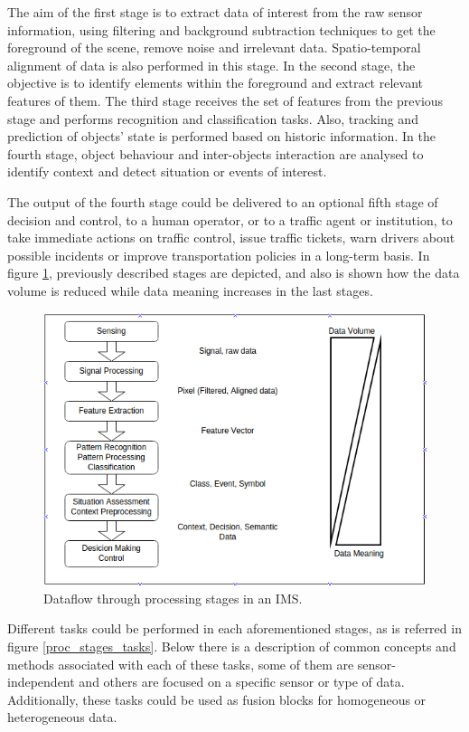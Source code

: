 \documentclass[10pt,twocolumn,letterpaper]{article}
\begin{document}
The aim of the first stage is to extract data of interest from the raw sensor information, using filtering and background subtraction techniques to get the foreground of the scene, remove noise and irrelevant data. Spatio-temporal alignment of data is also performed in this stage. In the second stage, the objective is to identify elements within the foreground and extract relevant features of them. The third stage receives the set of features from the previous stage and performs recognition and classification tasks. Also, tracking and prediction of objects' state is performed based on historic information. In the fourth stage, object behaviour and inter-objects interaction are analysed to identify context and detect situation or events of interest.

The output of the fourth stage could be delivered to an optional fifth stage of decision and control, to a human operator, or to a traffic agent or institution, to take immediate actions on traffic control, issue traffic tickets, warn drivers about possible incidents or improve transportation policies in a long-term basis. In figure \ref{proc_stages}, previously described stages are depicted, and also is shown how the data volume is reduced while data meaning increases in the last stages.

\begin{figure}[ht!]
\centering
\includegraphics[scale=0.35]{../fig/3/proc_stages.png}
\caption{Dataflow through processing stages in an IMS.}
\label{proc_stages}
\end{figure}

Different tasks could be performed in each aforementioned stages, as is referred in figure \ref{proc_stages_tasks}. Below there is a description of common concepts and methods associated with each of these tasks, some of them are sensor-independent and others are focused on a specific sensor or type of data. Additionally, these tasks could be used as fusion blocks for homogeneous or heterogeneous data.
\end{document}
